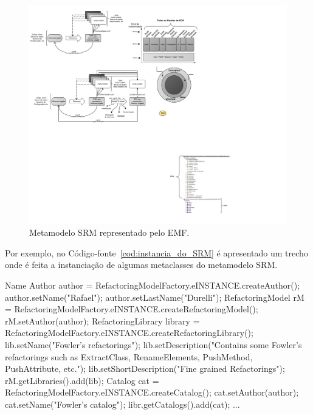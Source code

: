 \begin{figure}[!h]
	\centering
	\caption{Metamodelo SRM representado pelo EMF.}
	\label{fig:srm_emf}
	\includegraphics[scale=0.9]{images/srm_kdm_intreg}
	\fautor
\end{figure}

Por exemplo, no Código-fonte~\ref{cod:instancia_do_SRM} é apresentado um trecho onde é feita a instanciação de algumas metaclasses do metamodelo SRM. 

\begin{codigo}[caption={[Instanciação do metamodelo SRM programaticamente.] Instanciação do metamodelo SRM.},escapeinside={(*@}{@*)}, basicstyle=\footnotesize, label={cod:instancia_do_SRM}, language=Java]{Name}
Author author = RefactoringModelFactory.eINSTANCE.createAuthor();
author.setName("Rafael");
author.setLastName("Durelli");
RefactoringModel rM = RefactoringModelFactory.eINSTANCE.createRefactoringModel();
rM.setAuthor(author);
RefactoringLibrary library = RefactoringModelFactory.eINSTANCE.createRefactoringLibrary();
lib.setName("Fowler's refactorings");
lib.setDescription("Contains some Fowler's refactorings such as ExtractClass, RenameElements, PushMethod, PushAttribute, etc.");
lib.setShortDescription("Fine grained Refactorings");
rM.getLibraries().add(lib);
Catalog cat = RefactoringModelFactory.eINSTANCE.createCatalog();
cat.setAuthor(author);
cat.setName("Fowler's catalog");
libr.getCatalogs().add(cat);
...
\end{codigo}

